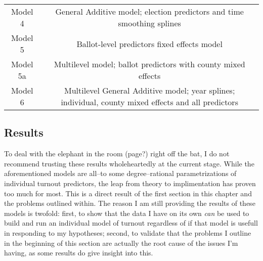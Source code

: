 \documentclass[12pt,twoside]{reedthesis}
\begin{document}
\begin{longtable}[]{@{}cc@{}}
\begin{minipage}[t]{0.15\columnwidth}
  Model 4\strut
  \end{minipage} & \begin{minipage}[t]{0.80\columnwidth}\centering\strut
  General Additive model; election predictors and time smoothing
  splines\strut
  \end{minipage}\tabularnewline
  \begin{minipage}[t]{0.15\columnwidth}\centering\strut
  Model 5\strut
  \end{minipage} & \begin{minipage}[t]{0.80\columnwidth}\centering\strut
  Ballot-level predictors fixed effects model\strut
  \end{minipage}\tabularnewline
  \begin{minipage}[t]{0.15\columnwidth}\centering\strut
  Model 5a\strut
  \end{minipage} & \begin{minipage}[t]{0.80\columnwidth}\centering\strut
  Multilevel model; ballot predictors with county mixed effects\strut
  \end{minipage}\tabularnewline
  \begin{minipage}[t]{0.15\columnwidth}\centering\strut
  Model 6\strut
  \end{minipage} & \begin{minipage}[t]{0.80\columnwidth}\centering\strut
  Multilevel General Additive model; year splines; individual, county
  mixed effects and all predictors\strut
  \end{minipage}\tabularnewline
  \bottomrule
  \end{longtable}
  
  \subsection{Results}\label{results-1}
  
  To deal with the elephant in the room (page?) right off the bat, I do
  not recommend trusting these results wholeheartedly at the current
  stage. While the aforementioned models are all--to some degree--rational
  parametrizations of individual turnout predictors, the leap from theory
  to implimentation has proven too much for most. This is a direct result
  of the first section in this chapter and the problems outlined within.
  The reason I am still providing the results of these models is twofold:
  first, to show that the data I have on its own \emph{can} be used to
  build and run an individual model of turnout regardless of if that model
  is usefull in responding to my hypotheses; second, to validate that the
  problems I outline in the beginning of this section are actually the
  root cause of the issues I'm having, as some results do give insight
  into this.
  
\end{document}
